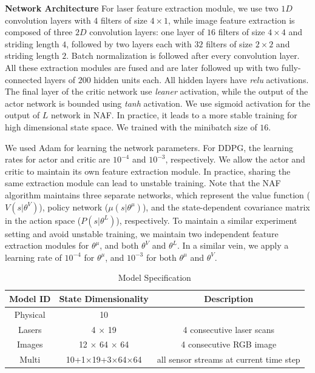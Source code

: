 \documentclass[../thesis.tex]{subfiles}
\begin{document}
\textbf{Network Architecture}
For laser feature extraction module, we use two $1D$ convolution layers with $4$ filters of size $4 \times 1$, while image feature extraction is composed of three $2D$ convolution layers: one layer of $16$ filters of size $4 \times 4$ and striding length $4$, followed by two layers each with $32$ filters of size $2 \times 2 $ and striding length $2$. Batch normalization is followed after every convolution layer. All these extraction modules are fused and are later followed up with two fully-connected layers of $200$ hidden units each. All hidden layers have \emph{relu} activations. The final layer of the critic network use \emph{leaner} activation, while the output of the actor network is bounded using \emph{tanh} activation. We use sigmoid activation for the output of $L$ network in NAF. In practice, it leads to a more stable training for high dimensional state space. We trained with the minibatch size of $16$.
 
We used Adam \cite{adam} for learning the network parameters. For DDPG, the learning rates for actor and critic are $10^{-4}$ and $10^{-3}$, respectively. We allow the actor and critic to maintain its own feature extraction module. In practice, sharing the same extraction module can lead to unstable training. Note that the NAF algorithm maintains three separate networks, which represent the value function ($V(s|\theta^V)$), policy network ($\mu(s|\theta^\mu)$), and the state-dependent covariance matrix in the action space ($P(s|\theta^L)$), respectively. To maintain a similar experiment setting and avoid unstable training, we maintain two independent feature extraction modules for $\theta^\mu$, and both $\theta^V$ and $\theta^L$. In a similar vein, we apply a learning rate of $10^{-4}$ for $\theta^\mu$, and $10^{-3}$ for both  $\theta^\mu$ and $\theta^V$.
 
\begin{table}[t]
    \vskip 0.1in
    \caption{Model Specification}
    \label{table:model-spec}
    \vskip 0.1in
    \centering
    \begin{small}
    \begin{tabular}{ccc}
    \toprule
    \centering
    Model ID & State Dimensionality & Description \\ \midrule \midrule
    Physical & 10 & \\
    Lasers & 4 $\times$ 19 & 4 consecutive laser scans \\
    Images & 12 $\times$ 64 $\times$ 64 & 4 consecutive RGB image \\
    Multi  & 10+1$\times$19+3$\times$64$\times$64 & all sensor streams at current time step \\ \toprule
    \end{tabular}
    \end{small}
\end{table}
 
\end{document}
